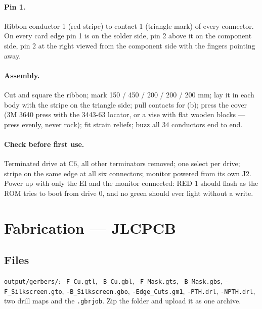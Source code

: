 \documentclass[11pt,a4paper]{article}
\begin{document}
\paragraph{Pin 1.} Ribbon conductor 1 (red stripe) to contact 1 (triangle mark) of every connector. On every
card edge pin 1 is on the solder side, pin 2 above it on the component side, pin 2 at the right viewed from
the component side with the fingers pointing away.

\paragraph{Assembly.} Cut and square the ribbon; mark 150 / 450 / 200 / 200 / 200 mm; lay it in each body
with the stripe on the triangle side; pull contacts for (b); press the cover (3M 3640 press with the 3443-63
locator, or a vise with flat wooden blocks --- press evenly, never rock); fit strain reliefs; buzz all 34
conductors end to end.

\paragraph{Check before first use.} Terminated drive at C6, all other terminators removed; one select per
drive; stripe on the same edge at all six connectors; monitor powered from its own J2. Power up with only
the EI and the monitor connected: RED 1 should flash as the ROM tries to boot from drive 0, and no green should
ever light without a write.

\clearpage
\section{Fabrication --- JLCPCB}\label{sec:fab}

\subsection{Files}
\texttt{output/gerbers/}: \texttt{-F\_Cu.gtl}, \texttt{-B\_Cu.gbl}, \texttt{-F\_Mask.gts}, \texttt{-B\_Mask.gbs},
\texttt{-F\_Silkscreen.gto}, \texttt{-B\_Silkscreen.gbo}, \texttt{-Edge\_Cuts.gm1}, \texttt{-PTH.drl}, \texttt{-NPTH.drl},
two drill maps and the \texttt{.gbrjob}. Zip the folder and upload it as one archive.
\end{document}
